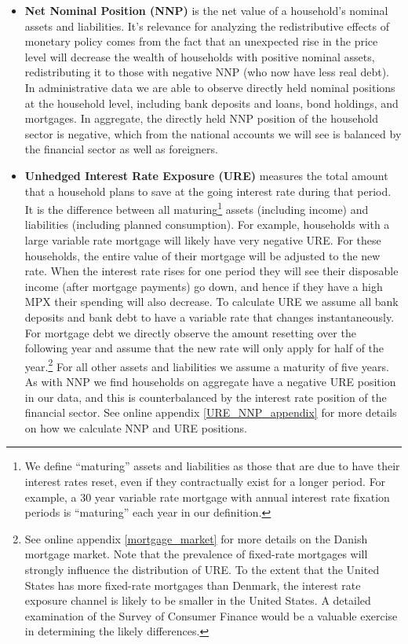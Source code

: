 \documentclass[titlepage]{\econtex}\newcommand{\texname}{ConsumptionHeterogeneity}
\begin{document}
\begin{itemize}
	\item \textbf{Net Nominal Position (NNP)} is the net value of a household's nominal assets and liabilities. It's relevance for analyzing the redistributive effects of monetary policy comes from the fact that an unexpected rise in the price level will decrease the wealth of households with positive nominal assets, redistributing it to those with negative NNP (who now have less real debt). In administrative data we are able to observe directly held nominal positions at the household level, including bank deposits and loans, bond holdings, and mortgages. In aggregate, the directly held NNP position of the household sector is negative, which from the national accounts we will see is balanced by the financial sector as well as foreigners.
	\item \textbf{Unhedged Interest Rate Exposure (URE)} measures the total amount that a household plans to save at the going interest rate during that period. It is the difference between all maturing\footnote{We define ``maturing'' assets and liabilities as those that are due to have their interest rates reset, even if they contractually exist for a longer period. For example, a 30 year variable rate mortgage with annual interest rate fixation periods is ``maturing'' each year in our definition.} assets (including income) and liabilities (including planned consumption). For example, households with a large variable rate mortgage will likely have very negative URE. For these households, the entire value of their mortgage will be adjusted to the new rate. When the interest rate rises for one period they will see their disposable income (after mortgage payments) go down, and hence if they have a high MPX their spending will also decrease. To calculate URE we assume all bank deposits and bank debt to have a variable rate that changes instantaneously. For mortgage debt we directly observe the amount resetting over the following year and assume that the new rate will only apply for half of the year.\footnote{See online appendix \ref{mortgage_market} for more details on the Danish mortgage market. Note that the prevalence of fixed-rate mortgages will strongly influence the distribution of URE. To the extent that the United States has more fixed-rate mortgages than Denmark, the interest rate exposure channel is likely to be smaller in the United States. A detailed examination of the Survey of Consumer Finance would be a valuable exercise in determining the likely differences.} For all other assets and liabilities we assume a maturity of five years. As with NNP we find households on aggregate have a negative URE position in our data, and this is counterbalanced by the interest rate position of the financial sector. See online appendix \ref{URE_NNP_appendix} for more details on how we calculate NNP and URE positions.
\end{itemize}
\end{document}
